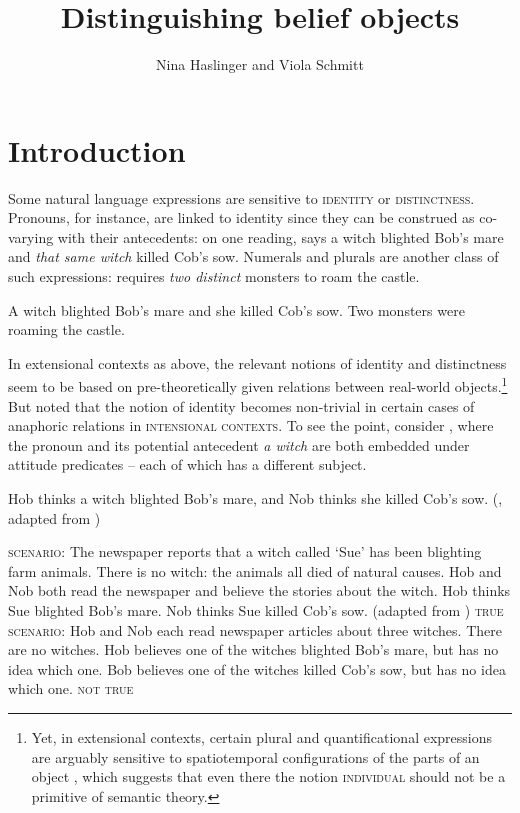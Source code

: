 \documentclass[output=paper]{langscibook}
\author{Nina Haslinger\affiliation{Georg-August-Universität Göttingen} and Viola Schmitt\affiliation{Humboldt-Universität zu Berlin}}
\title{Distinguishing belief objects}
\begin{document}
\maketitle



\section{Introduction} 

Some natural language expressions are sensitive to \textsc{identity} or \textsc{distinctness}. Pronouns, for instance, are linked to identity since they can be construed as co-varying with their antecedents: on one reading,  says a witch blighted Bob's mare and \textit{that same witch} killed Cob's sow. Numerals and plurals are another class of such expressions:  requires \textit{two distinct} monsters to roam the castle.

\ea
\ea\label{sch-has:ex:1} A witch blighted Bob's mare and she killed Cob's sow.
\ex\label{sch-has:ex:2} Two monsters were roaming the castle.
\z\z

\noindent In extensional contexts as above, the relevant notions of identity and distinctness seem to be based on pre-theoretically given relations between real-world objects.\footnote{Yet, in extensional contexts, certain plural and quantificational expressions are arguably sensitive to spatiotemporal configurations of the parts of an object \citep{Wagiel:2018}, which suggests that even there the notion \textsc{individual} should not be a primitive of semantic theory.} But \citet{Geach:1967} noted that the notion of identity becomes non-trivial  in certain cases of anaphoric relations in \textsc{intensional contexts}. To see the point, consider , where the pronoun and its potential antecedent \textit{a witch} are both embedded under attitude predicates -- each of which has a different subject.

\ea\label{sch-has:ex:3} Hob thinks a witch blighted Bob's mare, and Nob thinks she killed Cob's sow.  \hfill (\citealt[1, (1)]{Edelberg:1986}, adapted from \citealt[628, (3)]{Geach:1967}) \z

\eanoraggedright
\eanoraggedright\label{sch-has:ex:4} \textsc{scenario:} The newspaper reports that a witch called `Sue' has been blighting farm animals. There is no witch: the animals all died of natural causes.  Hob and Nob both read the newspaper and believe the stories about the witch. Hob thinks Sue blighted Bob's mare. Nob thinks Sue killed Cob's sow. (adapted from \citealt[2]{Edelberg:1986}) \phantom{.}\hfill {} \textsc{true}
\ex\label{sch-has:ex:5} \textsc{scenario:}  Hob and Nob each read newspaper articles about three wit\-ches. There are no witches. Hob believes one of the witches blighted Bob's mare, but has no idea which one. Bob believes one of the witches killed Cob's sow, but has no idea which one.  \hfill {} \textsc{not true}
\z\z
\end{document}
